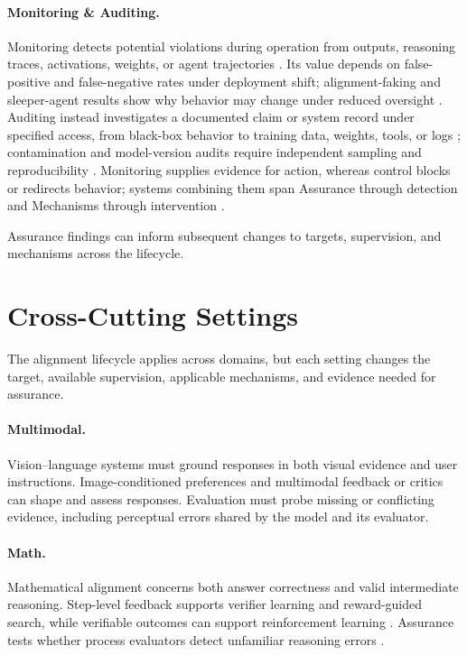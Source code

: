 \documentclass[11pt]{article}
\begin{document}
\paragraph{Monitoring \& Auditing.}
Monitoring detects potential violations during operation from outputs, reasoning traces, activations, weights, or agent trajectories \citep{arnav2025cot,li2025streaming,zhong2026weights,feng2026benchmarking}. Its value depends on false-positive and false-negative rates under deployment shift; alignment-faking and sleeper-agent results show why behavior may change under reduced oversight \citep{greenblatt2025alignmentfaking,hubinger2024sleeper}. Auditing instead investigates a documented claim or system record under specified access, from black-box behavior to training data, weights, tools, or logs \citep{casper2024blackbox}; contamination and model-version audits require independent sampling and reproducibility \citep{oren2024contamination,richter2025auditing}. Monitoring supplies evidence for action, whereas control blocks or redirects behavior; systems combining them span Assurance through detection and Mechanisms through intervention \citep{greenblatt2024control}.

Assurance findings can inform subsequent changes to targets, supervision, and mechanisms across the lifecycle.






\section{Cross-Cutting Settings}
\label{sec:cross-cutting-settings}

The alignment lifecycle applies across domains, but each setting changes the target, available supervision, applicable mechanisms, and evidence needed for assurance.

\paragraph{Multimodal.}
Vision--language systems must ground responses in both visual evidence and user instructions. Image-conditioned preferences \citep{yu2024rlhfv,liu2024llavarlhf,zhang2025mmrlhf} and multimodal feedback or critics \citep{li2024vlfeedback,xiong2025llavacritic} can shape and assess responses. Evaluation must probe missing or conflicting evidence, including perceptual errors shared by the model and its evaluator.

\paragraph{Math.}
Mathematical alignment concerns both answer correctness and valid intermediate reasoning. Step-level feedback \citep{lightman2024verify,wang2024mathshepherd} supports verifier learning and reward-guided search, while verifiable outcomes can support reinforcement learning \citep{hosseini2024vstar,deepseek2025r1}. Assurance tests whether process evaluators detect unfamiliar reasoning errors \citep{song2025prmbench}.
\end{document}
